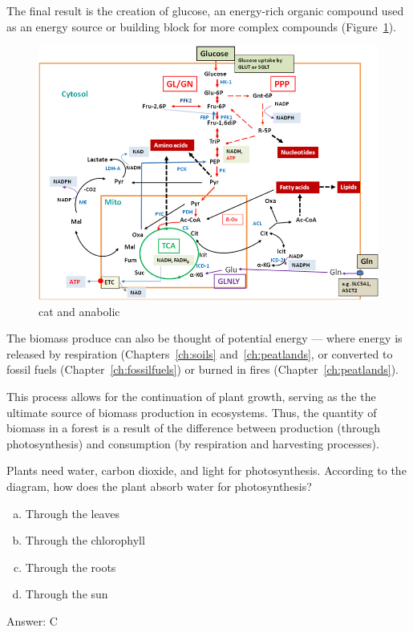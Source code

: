 The final result is the creation of glucose, an energy-rich organic compound used as an energy source or building block for more complex compounds (Figure~\ref{fig:Major-catabolic-and-anabolic-pathways-in-mammalian}). 
  
\begin{figure}
	\centering
\includegraphics[width=.5\textwidth]{graphics/Major-catabolic-and-anabolic-pathways-in-mammalian.png}
	\caption{cat and anabolic}
	\label{fig:Major-catabolic-and-anabolic-pathways-in-mammalian}
\end{figure}

    
The biomass produce can also be thought of potential energy --- where energy is released by respiration (Chapters~\ref{ch:soils} and~\ref{ch:peatlands}, or converted to fossil fuels (Chapter~\ref{ch:fossilfuels}) or burned in fires (Chapter~\ref{ch:peatlands}). 

This process allows for the continuation of plant growth, serving as the the ultimate source of biomass production in ecosystems. Thus, the quantity of biomass in a forest is a result of the difference between production (through photosynthesis) and consumption (by respiration and harvesting processes).



\begin{problem}
  Plants need water, carbon dioxide, and light for photosynthesis. According to the diagram, how does the plant absorb water for photosynthesis? 
\begin{enumerate}[(a)]
    \item Through the leaves
    \item Through the chlorophyll
    \item Through the roots
    \item Through the sun
\end{enumerate}  


\end{problem}

Answer: C

